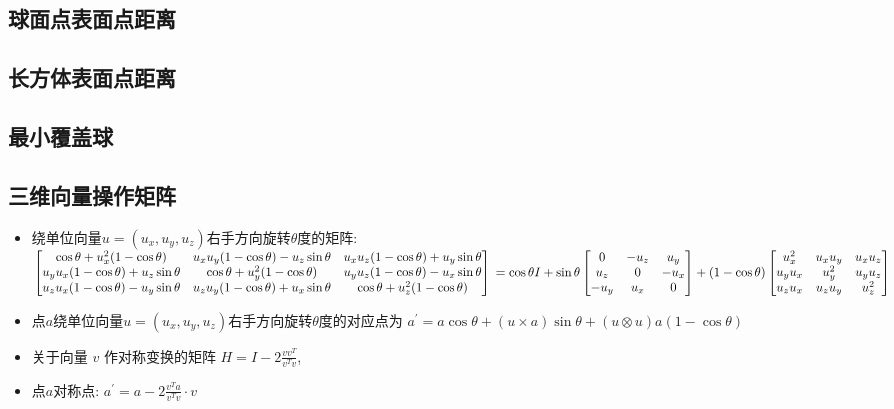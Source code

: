 \documentclass[landscape, twocolumn, 8pt, a4paper, twoside]{extarticle}
\begin{document}
  \subsection{球面点表面点距离}
  

  \subsection{长方体表面点距离}
  

  \subsection{最小覆盖球}
  

  \subsection{三维向量操作矩阵}
  \begin{itemize}
  \item 绕单位向量$u = (u_x, u_y, u_z)$右手方向旋转$\theta$度的矩阵: \\
    $
    \begin{bmatrix}
      \cos\theta + u_x^2 (1 - \cos\theta)    &    u_x u_y (1 - \cos\theta) - u_z \sin\theta    &    u_x u_z (1 - \cos\theta) + u_y \sin\theta \\
    u_y u_x (1 - \cos\theta) + u_z \sin\theta    &    \cos\theta + u_y^2 (1 - \cos\theta)    &    u_y u_z (1 - \cos\theta) - u_x \sin\theta \\
    u_z u_x (1 - \cos\theta) - u_y \sin\theta    &    u_z u_y (1 - \cos\theta) + u_x \sin\theta    &    \cos\theta + u_z^2 (1 - \cos\theta)
  \end{bmatrix} \\
  = \cos\theta I
  + \sin\theta
  \begin{bmatrix}
    0    &    -u_z    &    u_y \\
    u_z    &    0    &    -u_x \\
    -u_y    &    u_x    &    0
  \end{bmatrix}
  + (1 - \cos\theta)
  \begin{bmatrix}
    u_x ^ 2    &    u_x u_y    &    u_x u_z \\
    u_y u_x    &    u_y ^ 2    &    u_y u_z \\
    u_z u_x    &    u_z u_y    &    u_z ^ 2
  \end{bmatrix}
  $
  \item 点$a$绕单位向量$u = (u_x, u_y, u_z)$右手方向旋转$\theta$度的对应点为
  $a^\prime = a \cos\theta + (u \times a) \sin\theta + (u \otimes u) a (1 - \cos\theta)$
  \item 关于向量 $v$ 作对称变换的矩阵 $H = I - 2 \frac{v v^T}{v^T v}$,
  \item 点$a$对称点: $a^\prime = a - 2 \frac{v^T a}{v^T v} \cdot v$
  \end{itemize}
\end{document}
